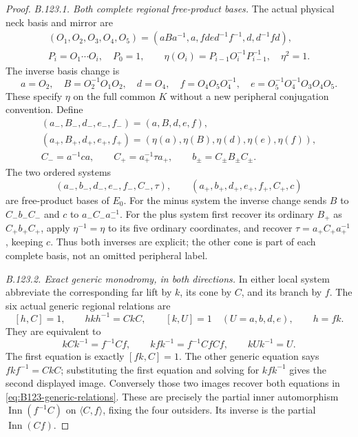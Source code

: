 \begin{proof}
\emph{B.123.1. Both complete regional free-product bases.}
The actual physical neck basis and mirror are
\begin{equation}\label{eq:B123-eta}
 \begin{gathered}
 (O_1,O_2,O_3,O_4,O_5)
  =(aBa^{-1},a,fde d^{-1}f^{-1},d,d^{-1}fd),\\
 P_i=O_1\cdots O_i,\quad P_0=1,\qquad
 \eta(O_i)=P_{i-1}O_i^{-1}P_{i-1}^{-1},\quad \eta^2=1.
 \end{gathered}
\end{equation}
The inverse basis change is
\[
 a=O_2,\quad B=O_2^{-1}O_1O_2,\quad d=O_4,\quad
 f=O_4O_5O_4^{-1},\quad e=O_5^{-1}O_4^{-1}O_3O_4O_5.
\]
These specify $\eta$ on the full common $K$ without a new
peripheral conjugation convention. Define
\begin{equation}\label{eq:B123-local-tuples}
 \begin{gathered}
 (a_-,B_-,d_-,e_-,f_-)=(a,B,d,e,f),\\
 (a_+,B_+,d_+,e_+,f_+)=(\eta(a),\eta(B),\eta(d),\eta(e),\eta(f)),\\
 C_-=a^{-1}ca,\qquad C_+=a_+^{-1}\tau a_+,\qquad
 b_\pm=C_\pm B_\pm C_\pm.
 \end{gathered}
\end{equation}
The two ordered systems
\[
 (a_-,b_-,d_-,e_-,f_-,C_-,\tau),\qquad
 (a_+,b_+,d_+,e_+,f_+,C_+,c)
\]
are free-product bases of $E_0$. For the minus system the inverse
change sends $B$ to $C_-b_-C_-$ and $c$ to $a_-C_-a_-^{-1}$.
For the plus system first recover its ordinary $B_+$ as
$C_+b_+C_+$, apply $\eta^{-1}=\eta$ to its five ordinary
coordinates, and recover $\tau=a_+C_+a_+^{-1}$, keeping $c$.
Thus both inverses are explicit; the other cone is part of each
complete basis, not an omitted peripheral label.

\emph{B.123.2. Exact generic monodromy, in both directions.}
In either local system abbreviate the corresponding far lift by
$k$, its cone by $C$, and its branch by $f$. The six actual generic
regional relations are
\begin{equation}\label{eq:B123-generic-relations}
 [h,C]=1,\qquad hkh^{-1}=CkC,\qquad
 [k,U]=1\quad(U=a,b,d,e),\qquad h=fk.
\end{equation}
They are equivalent to
\begin{equation}\label{eq:B123-partial-inner}
 kCk^{-1}=f^{-1}Cf,\qquad
 kfk^{-1}=f^{-1}CfCf,\qquad kUk^{-1}=U.
\end{equation}
The first equation is exactly $[fk,C]=1$. The other generic
equation says $fkf^{-1}=CkC$; substituting the first equation
and solving for $kfk^{-1}$ gives the second displayed image.
Conversely those two images recover both equations in
\eqref{eq:B123-generic-relations}. These are precisely the
partial inner automorphism $\operatorname{Inn}(f^{-1}C)$ on
$\langle C,f\rangle$, fixing the four outsiders. Its inverse
is the partial $\operatorname{Inn}(Cf)$.


\end{proof}
